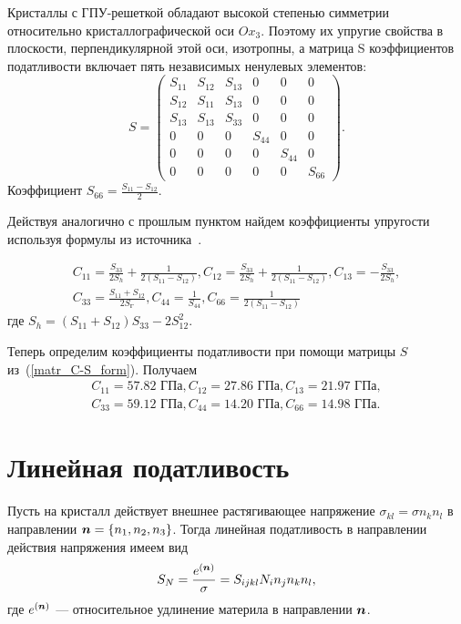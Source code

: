 \documentclass[12pt, a4paper]{article}
\renewcommand{\vec}[1]{\text{\mathversion{bold}${#1}$}}%
\begin{document}
Кристаллы с ГПУ-решеткой обладают высокой степенью симметрии относительно кристаллографической оси $Ox_3$. Поэтому их упругие свойства в плоскости, перпендикулярной этой оси, изотропны, а матрица S коэффициентов податливости включает пять независимых ненулевых элементов:
\[
S=
\begin{pmatrix}
	S_{11} & S_{12} & S_{13} & 0 & 0 & 0\\
	S_{12} & S_{11} & S_{13} & 0 & 0 & 0\\
	S_{13} & S_{13} & S_{33} & 0 & 0 & 0\\
	0 & 0 & 0 & S_{44} & 0 & 0\\
	0 & 0 & 0 & 0 & S_{44} & 0\\
	0 & 0 & 0 & 0 & 0 & S_{66} 
\end{pmatrix}.  
\]
Коэффициент $S_{66} = \frac{S_{11} - S_{12}}{2}$.

Действуя аналогично с прошлым пунктом найдем коэффициенты упругости используя формулы из источника~\cite{first-zarubin}.

\begin{gather*}
	C_{11} = \frac{S_{33}}{2 S_{h}} + \frac{1}{2 \left( S_{11} - S_{12} \right)}, 
	C_{12} = \frac{S_{33}}{2 S_{h}} + \frac{1}{2 \left( S_{11} - S_{12} \right)},
	C_{13} = -\frac{S_{33}}{2 S_{h}},\\
	C_{33} = \frac{S_{11} + S_{12}}{2 S_{Г}},
	C_{44} = \frac{1}{S_{44}},
	C_{66} = \frac{1}{2 \left( S_{11} - S_{12} \right)
	}
\end{gather*}
где $S_h = \left(S_{11} + S_{12}\right) S_{33} - 2 S_{12}^2$.

Теперь определим коэффициенты податливости при помощи матрицы $S$ из~(\ref{matr_C-S_form}). Получаем 
\begin{gather*}
	C_{11} = 57.82 \text{ ГПа},
	C_{12} = 27.86 \text{ ГПа},
	C_{13} = 21.97 \text{ ГПа},\\
	C_{33} = 59.12 \text{ ГПа},
	C_{44} = 14.20 \text{ ГПа},
	C_{66} = 14.98 \text{ ГПа}.
\end{gather*} 

\section{Линейная податливость}
Пусть на кристалл действует внешнее растягивающее напряжение $\sigma_{kl} = \sigma n_k n_l$ в направлении $\vec{n} = \{n_1, n_2, n_3  \}$. Тогда линейная податливость в направлении действия
напряжения имеем вид
\[
S_N = \frac{e^{(\vec{n})}}{\sigma} = S_{ijkl} N_i n_j n_k n_l,
\]
где $e^{(\vec{n})}$ --- относительное удлинение материла в направлении $\vec{n}$.
\end{document}
